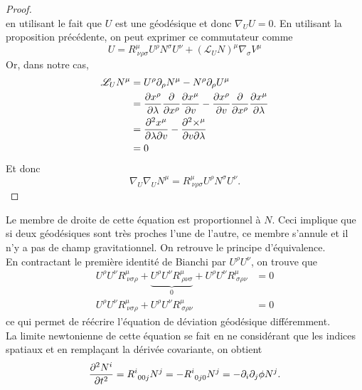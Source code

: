\documentclass[a4paper,11pt]{report}
\theoremstyle{definition}
\theoremstyle{plain}
\theoremstyle{definition}
\theoremstyle{remark}
\newcommand{\x}{\times}
\renewcommand{\L}{\mathscr{L}}
\newcommand{\p}{\partial}
\begin{document}
\begin{proof}
\begin{equation}
                \end{equation}
                en utilisant le fait que $U$ est une géodésique et donc $\nabla_U U = 0$. En utilisant la proposition précédente, on peut exprimer ce commutateur comme
                \begin{equation}
                    [\nabla_U,\nabla_N]U = R^\mu_{~\nu\rho\sigma}U^\rho N^\sigma U^\nu + (\L_U N)^\mu \nabla_\sigma V^\mu
                \end{equation}
                Or, dans notre cas,
                \begin{align}
                    \L_U N^\mu &= U^\rho\p_\rho N^\mu-N^\rho\p_\rho U^\mu\\
                    &= \pdv{x^\rho}{\lambda}\pdv{}{x^\rho}\pdv{x^\mu}{v}-\pdv{x^\rho}{v}\pdv{}{x^\rho}\pdv{x^\mu}{\lambda}\\
                    &= \pdv{x^\mu}{\lambda}{v}-\pdv{\x^\mu}{v}{\lambda}\\
                    &= 0
                \end{align}
                Et donc
                \begin{equation}
                    \nabla_U\nabla_U N^\mu = R^\mu_{~\nu\rho\sigma}U^\rho N^\sigma U^\nu.
                \end{equation}
            \end{proof}
            Le membre de droite de cette équation est proportionnel à $N$. Ceci implique que si deux géodésiques sont très proches l'une de l'autre, ce membre s'annule et il n'y a pas de champ gravitationnel. On retrouve le principe d'équivalence.\\
        
            En contractant le première identité de Bianchi par $U^\rho U^\nu$, on trouve que 
            \begin{align}
                U^\rho U^\nu R^\mu_{~\nu\sigma\rho}+\underbrace{U^\rho U^\nu R^\mu_{~\rho\nu\sigma}}_{0}+U^\rho U^\nu R^\mu_{~\sigma\rho\nu} &= 0\\
                U^\rho U^\nu R^\mu_{~\nu\sigma\rho}+U^\rho U^\nu R^\mu_{~\sigma\rho\nu} &= 0
            \end{align}
            ce qui permet de réécrire l'équation de déviation géodésique différemment.\\
            
            La limite newtonienne de cette équation se fait en ne considérant que les indices spatiaux et en remplaçant la dérivée covariante, on obtient
            \begin{equation}
                \pdv[2]{N^i}{t} = R^i_{~00j}N^j = -R^i_{~0j0}N^j = -\p_i\p_j\phi N^j.
            \end{equation}
        
\end{document}
